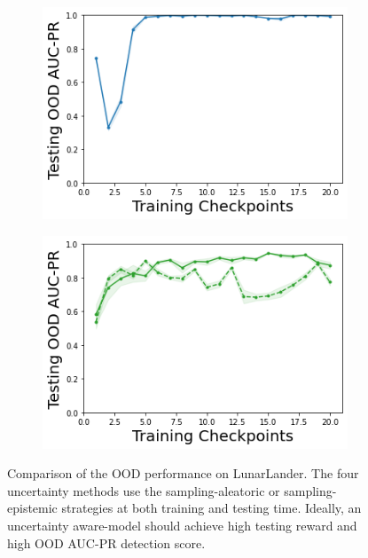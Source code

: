 \begin{figure}
\begin{subfigure}{.245\textwidth}
    \end{subfigure}
    \begin{subfigure}{.245\textwidth}
        \includegraphics[width=\textwidth]{sections/011_icml2022/resources/DKL-LunarLanderOOD-v0-AUC-PR-out-epistemic_-testing-strategy.png}
    \end{subfigure}
    \begin{subfigure}{.245\textwidth}
        \includegraphics[width=\textwidth]{sections/011_icml2022/resources/PostNet-LunarLanderOOD-v0-AUC-PR-out-epistemic_-testing-strategy.png}
    \end{subfigure}
        \vspace{-3mm}
    \caption{Comparison of the OOD performance on LunarLander. The four uncertainty methods use the sampling-aleatoric or sampling-epistemic strategies at both training and testing time. Ideally, an uncertainty aware-model should achieve high testing reward and high OOD AUC-PR detection score.}
    \label{fig:strategy-testing-ood-auc-pr-performance-lunarlander}
        \vspace{-3mm}
\end{figure}